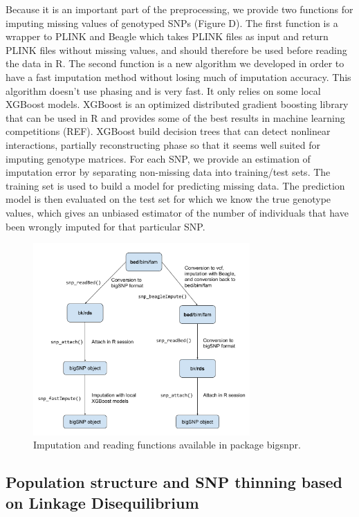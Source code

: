 \documentclass{bioinfo}
\begin{document}
\begin{methods}
Because it is an important part of the preprocessing, we provide two functions for imputing missing values of genotyped SNPs (Figure D). The first function is a wrapper to PLINK and Beagle which takes PLINK files as input and return PLINK files without missing values, and should therefore be used before reading the data in R. The second function is a new algorithm we developed in order to have a fast imputation method without losing much of imputation accuracy. This algorithm doesn't use phasing and is very fast. It only relies on some local XGBoost models. XGBoost is an optimized distributed gradient boosting library that can be used in R and provides some of the best results in machine learning competitions (REF). XGBoost build decision trees that can detect nonlinear interactions, partially reconstructing phase so that it seems well suited for imputing genotype matrices. For each SNP, we provide an estimation of imputation error by separating non-missing data into training/test sets. The training set is used to build a model for predicting missing data. The prediction model is then evaluated on the test set for which we know the true genotype values, which gives an unbiased estimator of the number of individuals that have been wrongly imputed for that particular SNP.

\begin{figure}[!tpb]
\centerline{\includegraphics[width=235pt]{imputation.pdf}}
\caption{Imputation and reading functions available in package bigsnpr.}\label{fig:impute}
\end{figure}


\subsection{Population structure and SNP thinning based on Linkage Disequilibrium} 


\end{methods}
\end{document}
